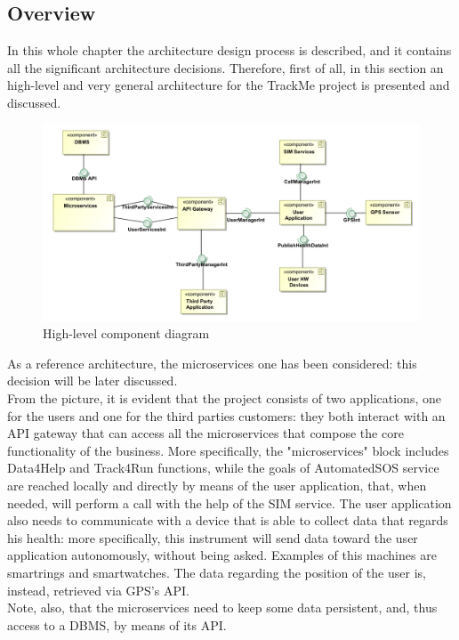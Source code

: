 \subsection{Overview}
In this whole chapter the architecture design process is described, and it contains all the significant
architecture decisions. 
Therefore, first of all, in this section an high-level and very general architecture for the TrackMe 
project is presented and discussed.  

\begin{figure}[H]
\includegraphics[width=\linewidth]{Images/highlevelcd.pdf}
\caption{ High-level component diagram }
\label{fig:highlevelcomponentdiagram}
\end{figure}

As a reference architecture, the microservices one has been considered: this decision will be later discussed. \\
From the picture, it is evident that the project consists of two applications, one for the users and one for the third parties customers: they both interact with an API gateway that can access all the
microservices that compose the core functionality of the business.
More specifically, the "microservices" block includes Data4Help and Track4Run functions, while the goals
of AutomatedSOS service are reached locally and directly by means of the user application, that, when
needed, will perform a call with the help of the SIM service. The user application also needs to
communicate with a device that is able to collect data that regards his health: more specifically, this
instrument will send data toward the user application autonomously, without being asked. Examples of 
this machines are smartrings and smartwatches. The data regarding the position of the user is, instead, retrieved via GPS's API. \\
Note, also, that the microservices need to keep some data persistent, and, thus access to a DBMS, by means
of its API. \\

